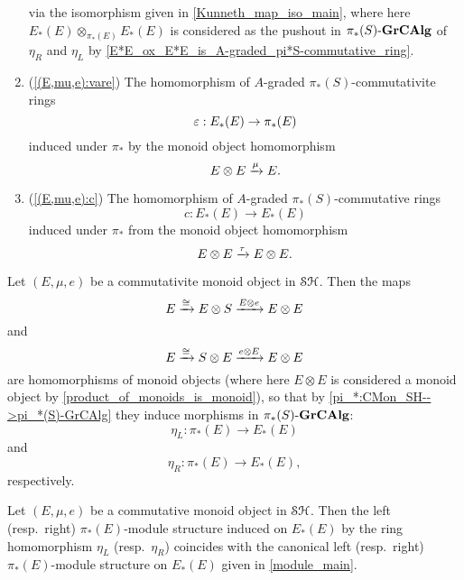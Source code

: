 \documentclass[../main.tex]{subfiles}
\begin{document}
\begin{definition}
\begin{enumerate}[label={\arabic*.}]
        via the isomorphism given in \autoref{Kunneth_map_iso_main}, where here $E_*(E)\otimes_{\pi_*(E)}E_*(E)$ is considered as the pushout in ${\pi_*(S)}\text-\mathbf{GrCAlg}$ of $\eta_R$ and $\eta_L$ by \autoref{E*E_ox_E*E_is_A-graded_pi*S-commutative_ring}.
        \item (\autoref{(E,mu,e):vare}) The homomorphism of $A$-graded $\pi_*(S)$-commutativite rings
        \[\varepsilon:E_*(E)\to\pi_*(E)\]
        induced under $\pi_*$ by the monoid object homomorphism
        \[E\otimes E\xrightarrow\mu E.\]
        \item (\autoref{(E,mu,e):c}) The homomorphism of $A$-graded $\pi_*(S)$-commutative rings
        \[c:E_*(E)\to E_*(E)\]
        induced under $\pi_*$ from the monoid object homomorphism
        \[E\otimes E\xrightarrow\tau E\otimes E.\]
    \end{enumerate}
\end{definition}

\begin{proposition}\label{(E,mu,e):eta_L,eta_R}
    Let $(E,\mu,e)$ be a commutativite monoid object in $\mathcal{SH}$. Then the maps
	\[E\xrightarrow\cong E\otimes S\xrightarrow{E\otimes e}E\otimes E\]
    and
    \[E\xrightarrow\cong S\otimes E\xrightarrow{e\otimes E}E\otimes E\]
	are homomorphisms of monoid objects (where here $E\otimes E$ is considered a monoid object by \autoref{product_of_monoids_is_monoid}), so that by \autoref{pi_*:CMon_SH-->pi_*(S)-GrCAlg} they induce morphisms in ${\pi_*(S)}\text-\mathbf{GrCAlg}$:
	\[\eta_L:\pi_*(E)\to E_*(E)\]
	and
	\[\eta_R:\pi_*(E)\to E_*(E),\]
	respectively.
\end{proposition}

\begin{lemma}\label{eta_L_left_module/eta_R_right_module_coincide}
    Let $(E,\mu,e)$ be a commutative monoid object in $\mathcal{SH}$. Then the left (resp.\ right) $\pi_*(E)$-module structure induced on $E_*(E)$ by the ring homomorphism $\eta_L$ (resp.\ $\eta_R$) coincides with the canonical left (resp.\ right) $\pi_*(E)$-module structure on $E_*(E)$ given in \autoref{module_main}.
\end{lemma}
\end{document}
